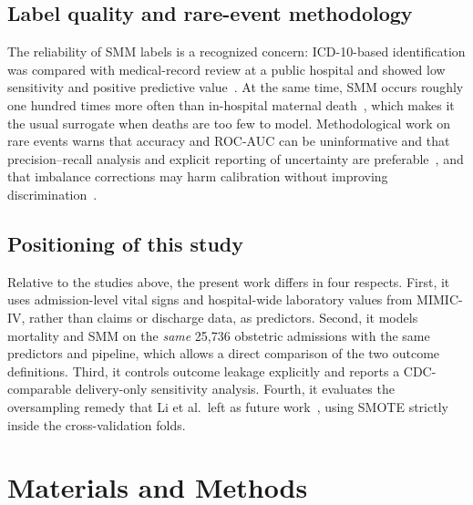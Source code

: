 \documentclass[healthcare,article,submit,pdftex,moreauthors]{Definitions/mdpi}
\begin{document}
\subsection{Label quality and rare-event methodology}
The reliability of SMM labels is a recognized concern: ICD-10-based identification
was compared with medical-record review at a public hospital and showed low
sensitivity and positive predictive value~\cite{Boulet2024ICD10SMM}. At the same time,
SMM occurs roughly one hundred times more often than in-hospital maternal
death~\cite{Callaghan2012SMM}, which makes it the usual surrogate when deaths are too
few to model. Methodological work on rare events warns that accuracy and ROC-AUC
can be uninformative and that precision--recall analysis and explicit reporting of
uncertainty are preferable~\cite{Marshall2023Imbalance,Saito2015PR}, and that
imbalance corrections may harm calibration without improving
discrimination~\cite{vandenGoorbergh2022Harm}.

\subsection{Positioning of this study}
Relative to the studies above, the present work differs in four respects. First, it uses
admission-level vital signs and hospital-wide laboratory values from MIMIC-IV, rather
than claims or discharge data, as predictors. Second, it models mortality and SMM on
the \emph{same} 25{,}736 obstetric admissions with the same predictors and pipeline,
which allows a direct comparison of the two outcome definitions. Third, it controls
outcome leakage explicitly and reports a CDC-comparable delivery-only sensitivity
analysis. Fourth, it evaluates the oversampling remedy that Li et al.\ left as future
work~\cite{Li2025Maryland}, using SMOTE strictly inside the cross-validation folds.

\section{Materials and Methods}\label{sec:methods}
\end{document}
